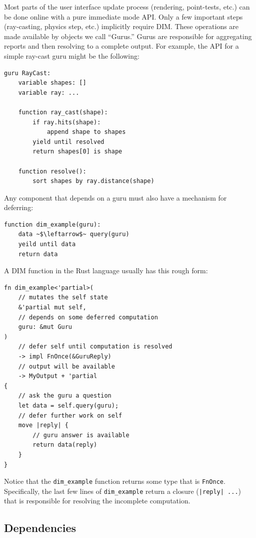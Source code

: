 \documentclass[conference,12pt]{IEEEtran}
\begin{document}
Most parts of the user interface update process (rendering, point-tests, etc.)
can be done online with a pure immediate mode API. Only a few important steps
(ray-casting, physics step, etc.) implicitly require DIM. These operations are
made available by objects we call ``Gurus.'' Gurus are responsible for
aggregating reports and then resolving to a complete output. For example, the
API for a simple ray-cast guru might be the following:

\begin{verbatim}
guru RayCast:
    variable shapes: []
    variable ray: ...

    function ray_cast(shape):
        if ray.hits(shape):
            append shape to shapes
        yield until resolved
        return shapes[0] is shape

    function resolve():
        sort shapes by ray.distance(shape)
\end{verbatim}

Any component that depends on a guru must also have a mechanism for deferring:

\begin{verbatim}
function dim_example(guru):
    data ~$\leftarrow$~ query(guru)
    yeild until data
    return data
\end{verbatim}

\newpage
A DIM function in the Rust language usually has this rough form:

\begin{verbatim}
fn dim_example<'partial>(
    // mutates the self state
    &'partial mut self,
    // depends on some deferred computation
    guru: &mut Guru
)
    // defer self until computation is resolved
    -> impl FnOnce(&GuruReply)
    // output will be available
    -> MyOutput + 'partial
{
    // ask the guru a question
    let data = self.query(guru);
    // defer further work on self
    move |reply| {
        // guru answer is available
        return data(reply)
    }
}
\end{verbatim}

Notice that the \texttt{dim\_example} function returns some type that is
\texttt{FnOnce}. Specifically, the last few lines of \texttt{dim\_example}
return a closure (\texttt{|reply| ...}) that is responsible for
resolving the incomplete computation.

\subsection{Dependencies}
\end{document}
